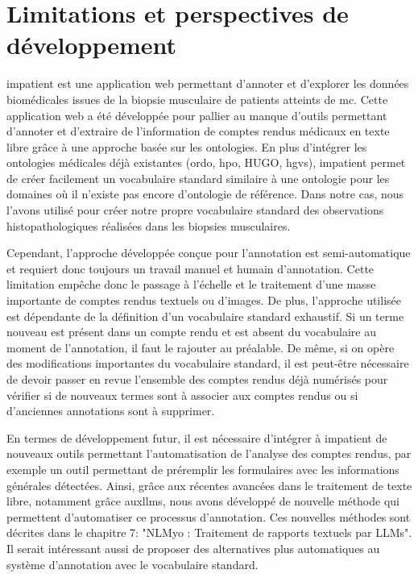 \section{Limitations et perspectives de développement}
\gls{impatient} est une application web permettant d'annoter et d'explorer les données biomédicales issues de la biopsie musculaire de patients atteints de \gls{mc}. Cette application web a été développée pour pallier au manque d'outils permettant d'annoter et d'extraire de l'information de comptes rendus médicaux en texte libre grâce à une approche basée sur les ontologies. En plus d'intégrer les ontologies médicales déjà existantes (\gls{ordo}, \gls{hpo}, HUGO, \gls{hgvs}), \gls{impatient} permet de créer facilement un vocabulaire standard similaire à une ontologie pour les domaines où il n'existe pas encore d'ontologie de référence. Dans notre cas, nous l'avons utilisé pour créer notre propre vocabulaire standard des observations histopathologiques réalisées dans les biopsies musculaires.


Cependant, l'approche développée conçue pour l'annotation est semi-automatique et requiert donc toujours un travail manuel et humain d'annotation. Cette limitation empêche donc le passage à l'échelle et le traitement d'une masse importante de comptes rendus textuels ou d'images. De plus, l'approche utilisée est dépendante de la définition d'un vocabulaire standard exhaustif. Si un terme nouveau est présent dans un compte rendu et est absent du vocabulaire au moment de l'annotation, il faut le rajouter au préalable. De même, si on opère des modifications importantes du vocabulaire standard, il est peut-être nécessaire de devoir passer en revue l'ensemble des comptes rendus déjà numérisés pour vérifier si de nouveaux termes sont à associer aux comptes rendus ou si d'anciennes annotations sont à supprimer.


En termes de développement futur, il est nécessaire d'intégrer à \gls{impatient}  de nouveaux outils permettant l'automatisation de l'analyse des comptes rendus, par exemple un outil permettant de préremplir les formulaires avec les informations générales détectées. Ainsi, grâce aux récentes avancées dans le traitement de texte libre, notamment grâce aux\gls{llms}, nous avons développé de nouvelle méthode qui permettent d'automatiser ce processus d'annotation. Ces nouvelles méthodes sont décrites dans le chapitre 7: "NLMyo : Traitement de rapports textuels par LLMs". Il serait intéressant aussi de proposer des alternatives plus automatiques au système d'annotation avec le vocabulaire standard.


